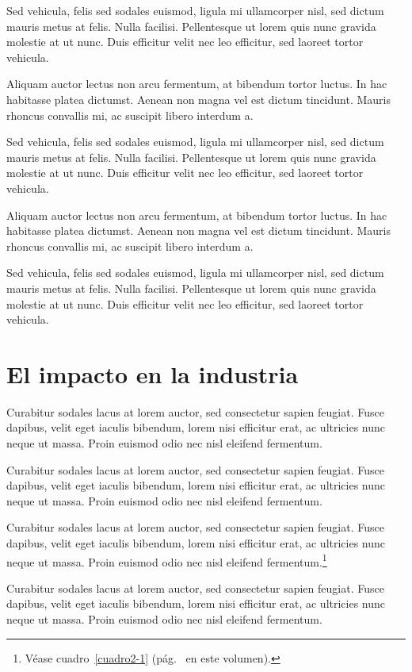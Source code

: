Sed vehicula, felis sed sodales euismod, ligula mi ullamcorper nisl, sed dictum mauris metus at felis. Nulla facilisi. Pellentesque ut lorem quis nunc gravida molestie at ut nunc. Duis efficitur velit nec leo efficitur, sed laoreet tortor vehicula.

Aliquam auctor lectus non arcu fermentum, at bibendum tortor luctus. In hac habitasse platea dictumst. Aenean non magna vel est dictum tincidunt. Mauris rhoncus convallis mi, ac suscipit libero interdum a.

Sed vehicula, felis sed sodales euismod, ligula mi ullamcorper nisl, sed dictum mauris metus at felis. Nulla facilisi. Pellentesque ut lorem quis nunc gravida molestie at ut nunc. Duis efficitur velit nec leo efficitur, sed laoreet tortor vehicula.

Aliquam auctor lectus non arcu fermentum, at bibendum tortor luctus. In hac habitasse platea dictumst. Aenean non magna vel est dictum tincidunt. Mauris rhoncus convallis mi, ac suscipit libero interdum a.

Sed vehicula, felis sed sodales euismod, ligula mi ullamcorper nisl, sed dictum mauris metus at felis. Nulla facilisi. Pellentesque ut lorem quis nunc gravida molestie at ut nunc. Duis efficitur velit nec leo efficitur, sed laoreet tortor vehicula.

\section{El impacto en la industria}

Curabitur sodales lacus at lorem auctor, sed consectetur sapien feugiat. Fusce dapibus, velit eget iaculis bibendum, lorem nisi efficitur erat, ac ultricies nunc neque ut massa. Proin euismod odio nec nisl eleifend fermentum.

Curabitur sodales lacus at lorem auctor, sed consectetur sapien feugiat. Fusce dapibus, velit eget iaculis bibendum, lorem nisi efficitur erat, ac ultricies nunc neque ut massa. Proin euismod odio nec nisl eleifend fermentum.

Curabitur sodales lacus at lorem auctor, sed consectetur sapien feugiat. Fusce dapibus, velit eget iaculis bibendum, lorem nisi efficitur erat, ac ultricies nunc neque ut massa. Proin euismod odio nec nisl eleifend fermentum.\footnote{Véase cuadro~\ref{cuadro2-1} (pág.~\pageref{cuadro2-1} en este volumen).}

Curabitur sodales lacus at lorem auctor, sed consectetur sapien feugiat. Fusce dapibus, velit eget iaculis bibendum, lorem nisi efficitur erat, ac ultricies nunc neque ut massa. Proin euismod odio nec nisl eleifend fermentum.

